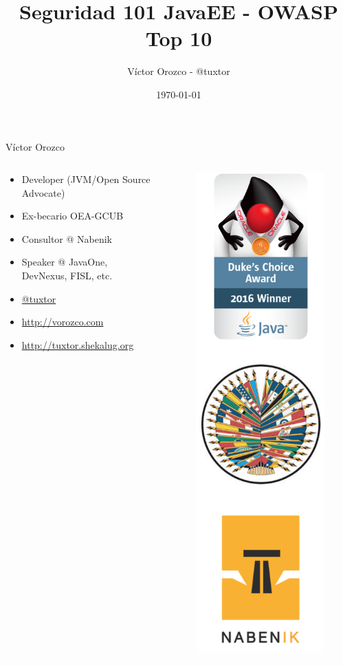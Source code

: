 \documentclass{beamer}
\title{Seguridad 101 JavaEE - OWASP Top 10}
\author{Víctor Orozco - @tuxtor}
\institute{Nabenik}
\date{\today}
\begin{document}
\frame{\titlepage}


\begin{frame}{Víctor Orozco}
    \begin{columns}[T] %
        \begin{column}[T]{6cm} %
            \begin{itemize}
                \item Developer (JVM/Open Source Advocate)
                \item Ex-becario OEA-GCUB
                \item Consultor @ Nabenik
                \item Speaker @ JavaOne, DevNexus, FISL, etc.
				\item \href{https://twitter.com/tuxtor}{@tuxtor}
				\item \href{http://vorozco.com}{http://vorozco.com}
				\item \href{http://tuxtor.shekalug.org}{http://tuxtor.shekalug.org} 
            \end{itemize}
        \end{column}
        \begin{column}[T]{4cm} %
            \begin{figure}
                \centering
                \includegraphics[width=0.35\linewidth]{Images/logos}
            \end{figure}
            

\end{column}
\end{columns}
\end{frame}
\end{document}
